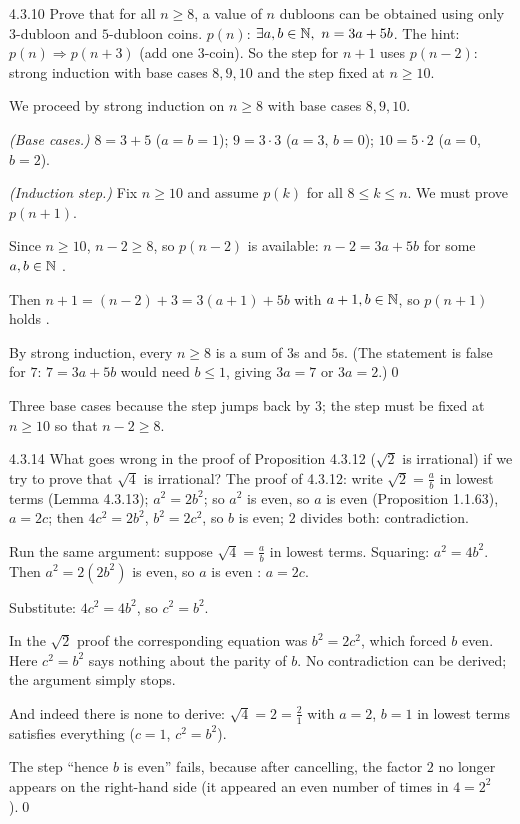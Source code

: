 \begin{bookex}[recommended]{4.3.10}
Prove that for all $n\ge8$, a value of $n$ dubloons can be obtained using only $3$-dubloon and $5$-dubloon coins.
\solution
\given $p(n)$: $\exists a,b\in\mathbb{N},\ n=3a+5b$. The hint: $p(n)\Rightarrow p(n+3)$ (add one $3$-coin). So the step for $n+1$ uses $p(n-2)$: strong induction with base cases $8,9,10$ and the step fixed at $n\ge10$.
\begin{steps}
\item We proceed by strong induction on $n\ge8$ with base cases $8,9,10$.
\item \emph{(Base cases.)} $8=3+5$ ($a=b=1$); $9=3\cdot3$ ($a=3$, $b=0$); $10=5\cdot2$ ($a=0$, $b=2$).
\item \emph{(Induction step.)} Fix $n\ge10$ and assume $p(k)$ for all $8\le k\le n$. We must prove $p(n+1)$.
\item Since $n\ge10$, $n-2\ge8$, so $p(n-2)$ is available: $n-2=3a+5b$ for some $a,b\in\mathbb{N}$ .
\item Then $n+1=(n-2)+3=3(a+1)+5b$ with $a+1,b\in\mathbb{N}$, so $p(n+1)$ holds .
\end{steps}
\conclusion By strong induction, every $n\ge8$ is a sum of $3$s and $5$s. (The statement is false for $7$: $7=3a+5b$ would need $b\le1$, giving $3a=7$ or $3a=2$.)\qed
\begin{compare}
\item Three base cases because the step jumps back by $3$; the step must be fixed at $n\ge10$ so that $n-2\ge8$.
\end{compare}
\end{bookex}

\begin{bookex}[essential]{4.3.14}
What goes wrong in the proof of Proposition 4.3.12 ($\sqrt2$ is irrational) if we try to prove that $\sqrt4$ is irrational?
\solution
\given The proof of 4.3.12: write $\sqrt2=\frac ab$ in lowest terms (Lemma 4.3.13); $a^2=2b^2$; so $a^2$ is even, so $a$ is even (Proposition 1.1.63), $a=2c$; then $4c^2=2b^2$, $b^2=2c^2$, so $b$ is even; $2$ divides both: contradiction.
\begin{steps}
\item Run the same argument: suppose $\sqrt4=\frac ab$ in lowest terms. Squaring: $a^2=4b^2$. Then $a^2=2(2b^2)$ is even, so $a$ is even : $a=2c$.
\item Substitute: $4c^2=4b^2$, so $c^2=b^2$.
\item In the $\sqrt2$ proof the corresponding equation was $b^2=2c^2$, which forced $b$ even. Here $c^2=b^2$ says nothing about the parity of $b$. No contradiction can be derived; the argument simply stops.
\item And indeed there is none to derive: $\sqrt4=2=\frac21$ with $a=2$, $b=1$ in lowest terms satisfies everything ($c=1$, $c^2=b^2$).
\end{steps}
\conclusion The step ``hence $b$ is even'' fails, because after cancelling, the factor $2$ no longer appears on the right-hand side (it appeared an even number of times in $4=2^2$).\qed
\end{bookex}

